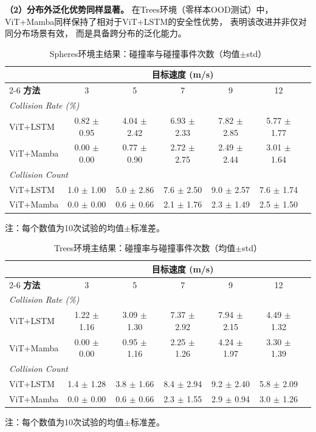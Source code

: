 \textbf{（2）分布外泛化优势同样显著。
} 在Trees环境（零样本OOD测试）中，
ViT+Mamba同样保持了相对于ViT+LSTM的安全性优势，
表明该改进并非仅对同分布场景有效，
而是具备跨分布的泛化能力。

\begin{table}[htbp]
\centering
\caption{Spheres环境主结果：碰撞率与碰撞事件次数（均值$\pm$std）}
\label{tab:main_spheres}
\begin{tabular}{lcccccc}
\toprule
 & \multicolumn{5}{c}{\textbf{目标速度 (m/s)}} \\
\cmidrule(lr){2-6}
\textbf{方法} & 3 & 5 & 7 & 9 & 12 \\
\midrule
\multicolumn{6}{l}{\textit{Collision Rate (\%)}} \\
ViT+LSTM & 0.82 $\pm$ 0.95 & 4.04 $\pm$ 2.42 & 6.93 $\pm$ 2.33 & 7.82 $\pm$ 2.85 & 5.77 $\pm$ 1.77 \\
ViT+Mamba & 0.00 $\pm$ 0.00 & 0.77 $\pm$ 0.90 & 2.72 $\pm$ 2.75 & 2.49 $\pm$ 2.44 & 3.01 $\pm$ 1.64 \\
\midrule
\multicolumn{6}{l}{\textit{Collision Count}} \\
ViT+LSTM & 1.0 $\pm$ 1.00 & 5.0 $\pm$ 2.86 & 7.6 $\pm$ 2.50 & 9.0 $\pm$ 2.57 & 7.6 $\pm$ 1.74 \\
ViT+Mamba & 0.0 $\pm$ 0.00 & 0.6 $\pm$ 0.66 & 2.1 $\pm$ 1.76 & 2.3 $\pm$ 1.49 & 2.5 $\pm$ 1.50 \\
\bottomrule
\end{tabular}
\begin{tablenotes}
\item {} 注：每个数值为10次试验的均值$\pm$标准差。
\end{tablenotes}
\end{table}

\begin{table}[htbp]
\centering
\caption{Trees环境主结果：碰撞率与碰撞事件次数（均值$\pm$std）}
\label{tab:main_trees}
\begin{tabular}{lcccccc}
\toprule
 & \multicolumn{5}{c}{\textbf{目标速度 (m/s)}} \\
\cmidrule(lr){2-6}
\textbf{方法} & 3 & 5 & 7 & 9 & 12 \\
\midrule
\multicolumn{6}{l}{\textit{Collision Rate (\%)}} \\
ViT+LSTM & 1.22 $\pm$ 1.16 & 3.09 $\pm$ 1.30 & 7.37 $\pm$ 2.92 & 7.94 $\pm$ 2.15 & 4.49 $\pm$ 1.32 \\
ViT+Mamba & 0.00 $\pm$ 0.00 & 0.95 $\pm$ 1.16 & 2.25 $\pm$ 1.26 & 4.24 $\pm$ 1.97 & 3.30 $\pm$ 1.39 \\
\midrule
\multicolumn{6}{l}{\textit{Collision Count}} \\
ViT+LSTM & 1.4 $\pm$ 1.28 & 3.8 $\pm$ 1.66 & 8.4 $\pm$ 2.94 & 9.2 $\pm$ 2.40 & 5.8 $\pm$ 2.09 \\
ViT+Mamba & 0.0 $\pm$ 0.00 & 0.6 $\pm$ 0.66 & 2.3 $\pm$ 1.55 & 2.9 $\pm$ 0.94 & 3.0 $\pm$ 1.26 \\
\bottomrule
\end{tabular}
\begin{tablenotes}
\item {} 注：每个数值为10次试验的均值$\pm$标准差。
\end{tablenotes}
\end{table}


